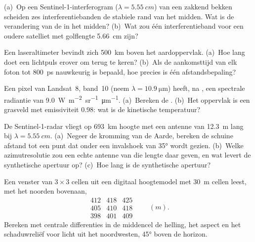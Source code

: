 \begin{exercise}[$\star$]\label{exo:b3:remote-sensing-gis:3}
(a)~Op een Sentinel-1-interferogram ($\lambda = \qty{5.55}{cm}$) van een
zakkend bekken scheiden zes interferentiebanden de stabiele rand van het midden.
Wat is de verandering van de  in het midden? (b)~Wat zou één
interferentieband voor een oudere satelliet met golflengte \qty{5.66}{cm} zijn?
\end{exercise}

\begin{exercise}[$\star$]\label{exo:b3:remote-sensing-gis:4}
Een laseraltimeter bevindt zich \qty{500}{km} boven het aardoppervlak. (a)~Hoe lang
doet een lichtpuls erover om terug te keren? (b)~Als de aankomsttijd van elk foton tot
\qty{800}{ps} nauwkeurig is bepaald, hoe precies is één afstandsbepaling?
\end{exercise}

\begin{exercise}[$\star\star$]\label{exo:b3:remote-sensing-gis:5}
Een pixel van Landsat~8, band~10 (neem $\lambda = \qty{10.9}{\micro\metre}$)
heeft, na , een spectrale radiantie van
\qty{9.0}{W.m^{-2}.sr^{-1}.\micro\metre^{-1}}. (a)~Bereken de
. (b)~Het oppervlak is een grasveld met emissiviteit 0.98: wat is
de kinetische temperatuur?
\end{exercise}

\begin{exercise}[$\star\star$]\label{exo:b3:remote-sensing-gis:6}
De Sentinel-1-radar vliegt op \qty{693}{km} hoogte met een antenne van \qty{12.3}{m}
lang bij $\lambda = \qty{5.55}{cm}$. (a)~Negeer de kromming van de
Aarde, bereken de schuine afstand tot een punt dat onder een invalshoek van
\ang{35} wordt gezien. (b)~Welke azimutresolutie zou een echte antenne van die lengte
daar geven, en wat levert de synthetische apertuur op? (c)~Hoe lang is de
synthetische apertuur?
\end{exercise}

\begin{exercise}[$\star\star$]\label{exo:b3:remote-sensing-gis:7}
Een venster van $3\times3$ cellen uit een digitaal hoogtemodel met \qty{30}{m} cellen
leest, met het noorden bovenaan,
\[
\begin{matrix} 412 & 418 & 425 \\ 405 & 410 & 418 \\ 398 & 401 & 409 \end{matrix}
\qquad (\unit{m}).
\]
Bereken met centrale differenties in de middencel de helling, het aspect
en het schaduwreliëf voor licht uit het noordwesten, \ang{45} boven de
horizon.
\end{exercise}

